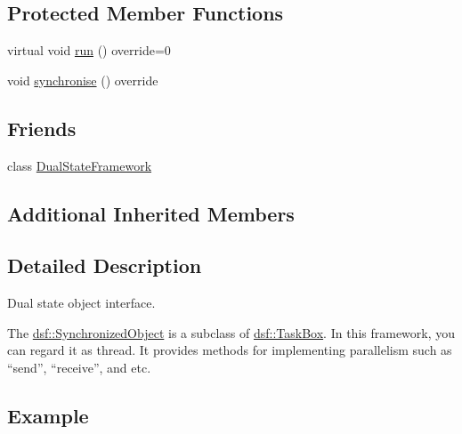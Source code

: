 \subsection*{Protected Member Functions}
\begin{DoxyCompactItemize}
\item 
virtual void \hyperlink{classdsf_1_1_synchronized_object_ae94875bd63d8071f8a563ac45ca7ccc2}{run} () override=0
\item 
void \hyperlink{classdsf_1_1_synchronized_object_a4e200d7b3508db98f09c6fe547f46cdb}{synchronise} () override
\end{DoxyCompactItemize}
\subsection*{Friends}
\begin{DoxyCompactItemize}
\item 
class \hyperlink{classdsf_1_1_synchronized_object_a86db03c65431cb461cc8abf33bd2e74a}{Dual\+State\+Framework}
\end{DoxyCompactItemize}
\subsection*{Additional Inherited Members}


\subsection{Detailed Description}
Dual state object interface. 

The \hyperlink{classdsf_1_1_synchronized_object}{dsf\+::\+Synchronized\+Object} is a subclass of \hyperlink{classdsf_1_1_task_box}{dsf\+::\+Task\+Box}. In this framework, you can regard it as thread. It provides methods for implementing parallelism such as “send”, “receive”, and etc.\hypertarget{classdsf_1_1_synchronized_object_Example}{}\subsection{Example}\label{classdsf_1_1_synchronized_object_Example}

